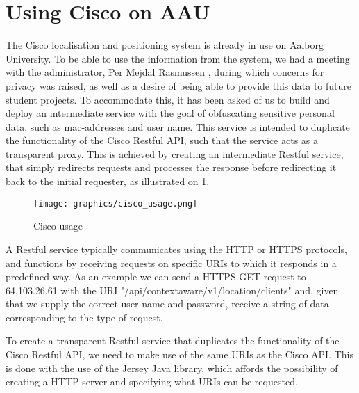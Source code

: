 \section{Using Cisco on AAU}
The Cisco localisation and positioning system is already in use on Aalborg University. To be able to use the information from the system, we had a meeting with the administrator, Per Mejdal Rasmussen , during which concerns for privacy was raised, as well as a desire of being able to provide this data to future student projects. To accommodate this, it has been asked of us to build and deploy an intermediate service with the goal of obfuscating sensitive personal data, such as mac-addresses and user name. This service is intended to duplicate the functionality of the Cisco Restful API, such that the service acts as a transparent proxy. This is achieved by creating an intermediate Restful service, that simply redirects requests and processes the response before redirecting it back to the initial requester, as illustrated on \cref{fig:cisco_usage}.

\begin{figure}[h]
	\begin{center}
	\texttt{[image: graphics/cisco\_usage.png]}
	\caption{Cisco usage}
	\label{fig:cisco_usage}
	\end{center} 
\end{figure}

A Restful service typically communicates using the HTTP or HTTPS protocols, and functions by receiving requests on specific URIs to which it responds in a predefined way. As an example we can send a HTTPS GET request to 64.103.26.61 with the URI "/api/contextaware/v1/location/clients" and, given that we supply the correct user name and password, receive a string of data corresponding to the type of request. 

To create a transparent Restful service that duplicates the functionality of the Cisco Restful API, we need to make use of the same URIs as the Cisco API. This is done with the use of the Jersey Java library, which affords the possibility of creating a HTTP server and specifying what URIs can be requested.

